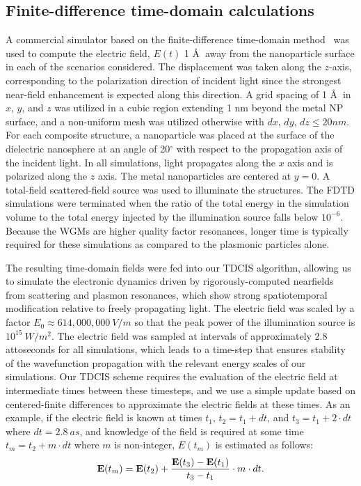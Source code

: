 \documentclass[journal=jpclcd,manuscript=article]{achemso}
\begin{document}
\subsection{Finite-difference time-domain calculations}
A commercial simulator based on the finite-difference time-domain method~\cite{Lumerical} was used to compute the electric field, $E(t)$
1 \AA $\:$  
away from the nanoparticle surface in each of the scenarios considered.  The displacement
was taken along the $z$-axis, corresponding to the polarization direction of incident light since the strongest
near-field enhancement is expected along this direction.  A grid spacing of 1 \AA $\:$  
in $x$, $y$, and $z$ was utilized
in a cubic region extending 1 nm beyond the metal NP surface, and a non-uniform mesh was utilized otherwise with $dx$, $dy$, $dz \leq 20 nm$.
For each composite structure, a nanoparticle was placed at the surface of the dielectric nanosphere at an angle of
20$^{\circ}$ with respect to the propagation axis of the incident light. In all simulations, light propagates
along the $x$ axis and is polarized along the $z$ axis.  The metal nanoparticles are centered at $y=0$.  
A total-field scattered-field source was used to illuminate the structures.  The FDTD simulations were terminated when the 
ratio of the total energy in the simulation volume to the total energy injected by the illumination source falls below
$10^{-6}$.  Because the WGMs are higher quality factor resonances, longer time is typically required for these simulations
as compared to the plasmonic particles alone.  

The resulting time-domain fields were fed into our TDCIS algorithm, allowing us to simulate the electronic dynamics
driven by rigorously-computed nearfields from scattering and plasmon resonances, which show strong spatiotemporal modification relative
to freely propagating light.  The electric field was scaled by a factor $E_0 \approx 614,000,000 \: V/m$ so that the peak power
of the illumination source is $10^{15} \: W/m^2$.  The electric field was sampled at intervals of approximately 2.8 attoseconds for all simulations, which leads
to a time-step that ensures stability of
the wavefunction propagation with the relevant energy scales of our simulations.  Our TDCIS scheme
requires the evaluation of the electric field at intermediate times between these timesteps, and we use a simple update
based on centered-finite differences to approximate the electric fields at these times.  As an example, if the 
electric field is known at times $t_1$, $t_2 = t_1 + dt$, and $t_3 = t_1 + 2\cdot dt$ where $dt = 2.8 \: as$, and knowledge
of the field is required at some time $t_m = t_2 + m\cdot dt$ where $m$ is non-integer, $E(t_m)$ is estimated as follows: 
\begin{equation}
{\bf E}(t_m) =  {\bf E}(t_2) + \frac{{\bf E}(t_3)-{\bf E}(t_1) }{t_3 - t_1 } \cdot m\cdot dt.
\end{equation}
\end{document}
